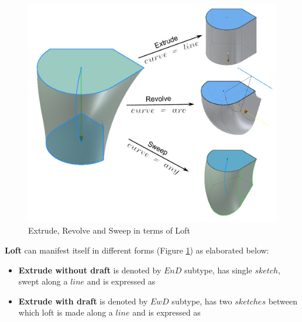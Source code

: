 \begin{figure}[htbp]
	\includegraphics[scale=0.35]{../Common/images//LoftExtrudeRevSwp.pdf} 
\caption{Extrude, Revolve and Sweep in terms of Loft}
\label{figure_extrevswp}
\end{figure}

{\bf Loft} can manifest itself in different forms (Figure \ref{figure_extrevswp}) as elaborated below:
\begin{itemize}[noitemsep,topsep=2pt,parsep=2pt,partopsep=2pt,label={},leftmargin=*]
\item {\bf Extrude without draft} is denoted by $EnD$ subtype, has single $sketch$, swept along a $line$ and is expressed as			
\item {\bf Extrude with draft} is denoted by $EwD$ subtype, has two $sketches$ between which loft is made along a $line$ and is expressed as 	
\end{itemize}

